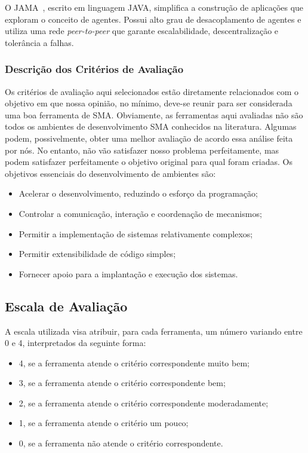 O JAMA~\citep{Leone:2011}, escrito em linguagem JAVA, simplifica a construção de aplicações que exploram o conceito de agentes. Possui alto grau de desacoplamento de agentes e utiliza uma rede \textit{peer-to-peer} que garante escalabilidade, descentralização e tolerância a falhas.



\subsubsection{Descrição dos Critérios de Avaliação} 

Os critérios de avaliação aqui selecionados estão diretamente relacionados com o objetivo em que nossa opinião, no mínimo, deve-se reunir para ser considerada uma boa ferramenta de SMA. Obviamente, as ferramentas aqui avaliadas não são todos os ambientes de desenvolvimento SMA conhecidos na literatura. Algumas podem, possivelmente, obter uma melhor avaliação de acordo essa análise feita por nós. No entanto, não vão satisfazer nosso problema perfeitamente, mas podem satisfazer perfeitamente o objetivo original para qual foram criadas. Os objetivos essenciais do desenvolvimento de ambientes são:


\begin{itemize}
\item Acelerar o desenvolvimento, reduzindo o esforço da programação;
\item Controlar a comunicação, interação e coordenação de mecanismos;
\item Permitir a implementação de sistemas relativamente complexos;
\item Permitir extensibilidade de código simples;
\item Fornecer apoio para a implantação e execução dos sistemas. 
\end{itemize}

\subsection*{Escala de Avaliação} 

A escala utilizada visa atribuir, para cada ferramenta, um número variando entre 0 e 4, interpretados da seguinte forma: 
\begin{itemize}
\item 4, se a ferramenta atende o critério correspondente muito bem;
\item 3, se a ferramenta atende o critério correspondente bem;
\item 2, se a ferramenta atende o critério correspondente moderadamente; 
\item 1, se a ferramenta atende o critério um pouco;
\item 0, se a ferramenta não atende o critério correspondente. 
\end{itemize}

